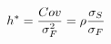 \documentclass[preview]{standalone}
\begin{document}
\begin{align*}
\special{dvisvgm:raw <g id='unique000'>}h^* = \frac{Cov}{\sigma_F^2} = \rho \frac{\sigma_S}{\sigma_F}\special{dvisvgm:raw </g>}
\end{align*}
\end{document}
